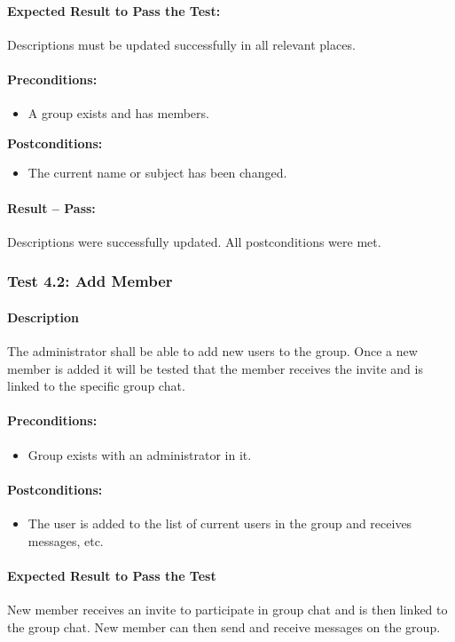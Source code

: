 \documentclass[11pt]{article}
\begin{document}
\paragraph{Expected Result to Pass the Test:}
Descriptions must be updated successfully in all relevant places.
\paragraph{Preconditions:} 
\begin{itemize}
\item A group exists and has members.
\end{itemize}
\textbf{Postconditions:}
\begin{itemize}
\item The current name or subject has been changed.
\end{itemize}
\paragraph{Result -- Pass:} Descriptions were successfully updated. All postconditions were met.

\subsubsection{Test 4.2: Add Member}
\paragraph{Description}
The administrator shall be able to add new users to the group. Once a new member is added it will be tested that the member receives the invite and is linked to the specific group chat.
\paragraph{Preconditions:} 
\begin{itemize}
\item Group exists with an administrator in it.
\end{itemize}
\paragraph{Postconditions:}
\begin{itemize}
\item The user is added to the list of current users in the group and receives messages, etc.
\end{itemize}
\paragraph{Expected Result to Pass the Test}
New member receives an invite to participate in group chat and is then linked to the group chat. New member can then send and receive messages on the group.
\end{document}
